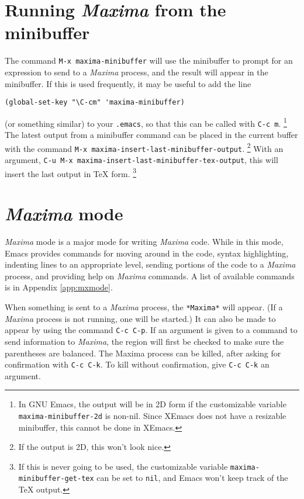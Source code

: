 \documentclass{article}
\newcommand{\mx}{\textsl{\sffamily Maxima}}
\begin{document}
\section{Running \mx{} from the minibuffer}

The command \texttt{M-x maxima-minibuffer} will use the minibuffer to
prompt for an expression to send to a \mx{} process, and the result
will appear in the minibuffer.  If this is used frequently, it may be
useful to add the line
\begin{verbatim}
(global-set-key "\C-cm" 'maxima-minibuffer)
\end{verbatim}
(or something similar) to your \texttt{.emacs}, so that this can be
called with \texttt{C-c m}.%
\footnote{In GNU Emacs, the output will be in 2D form if the
customizable variable \texttt{maxima-minibuffer-2d} is non-nil.  Since
XEmacs does not have a resizable minibuffer, this cannot be done in
XEmacs.} 
The latest output from a minibuffer command can be placed in the
current buffer with the command
\texttt{M-x maxima-insert-last-minibuffer-output}.%
\footnote{If the output is 2D, this won't look nice.}
With an argument, \texttt{C-u M-x
  maxima-insert-last-minibuffer-tex-output}, this will insert the last
output in \TeX{} form.%
\footnote{If this is never going to be used, the customizable variable 
\texttt{maxima-minibuffer-get-tex} can be set to \texttt{nil}, and
Emacs won't keep track of the \TeX{} output.}

\section{\mx{} mode}

\mx{} mode is a major mode for writing \mx{} code.  While in this
mode, Emacs provides commands for moving around in the code, syntax
highlighting, indenting lines to an appropriate level, sending
portions of the code to a \mx{} process, and providing help on \mx{}
commands.  A list of available commands is in Appendix
\ref{app:mxmode}.

When something is sent to a \mx{} process, the \texttt{*Maxima*} will
appear.  (If a \mx{} process is not running, one will be started.)  It
can also be made to appear by using the command \texttt{C-c C-p}.  If
an argument is given to a command to send information to \mx{}, the
region will first be checked to make sure the parentheses are
balanced.  The Maxima process can be killed, after asking for
confirmation with \texttt{C-c C-k}.  To kill without confirmation, give
\texttt{C-c C-k} an argument.
\end{document}
